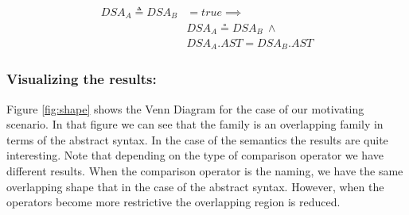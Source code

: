 \begin{itemize}
\begin{equation}
\begin{split}
  DSA_{A} \triangleq DSA_{B} & = true \implies \\
   & DSA_{A} \circeq DSA_{B} ~ \wedge \\
   & DSA_{A}.AST = DSA_{B}.AST
 \end{split}
\end{equation}
\end{itemize}



\vspace{-2mm}
\subsubsection{Visualizing the results:} Figure \ref{fig:shape} shows the Venn Diagram for the case of our motivating scenario. In that figure we can see that the family is an overlapping family in terms of the abstract syntax. In the case of the semantics the results are quite interesting. Note that depending on the type of comparison operator we have different results. When the comparison operator is the naming, we have the same overlapping shape that in the case of the abstract syntax. However, when the operators become more restrictive the overlapping region is reduced. 

